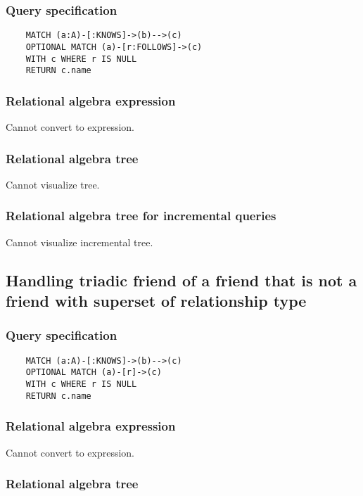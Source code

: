 	\subsubsection*{Query specification}

	\begin{lstlisting}
	MATCH (a:A)-[:KNOWS]->(b)-->(c)
	OPTIONAL MATCH (a)-[r:FOLLOWS]->(c)
	WITH c WHERE r IS NULL
	RETURN c.name
	\end{lstlisting}


	\subsubsection*{Relational algebra expression}

	Cannot convert to expression.

	\subsubsection*{Relational algebra tree}

	Cannot visualize tree.

	\subsubsection*{Relational algebra tree for incremental queries}

	Cannot visualize incremental tree.
	\subsection{Handling triadic friend of a friend that is not a friend with superset of relationship type}

	\subsubsection*{Query specification}

	\begin{lstlisting}
	MATCH (a:A)-[:KNOWS]->(b)-->(c)
	OPTIONAL MATCH (a)-[r]->(c)
	WITH c WHERE r IS NULL
	RETURN c.name
	\end{lstlisting}


	\subsubsection*{Relational algebra expression}

	Cannot convert to expression.

	\subsubsection*{Relational algebra tree}

